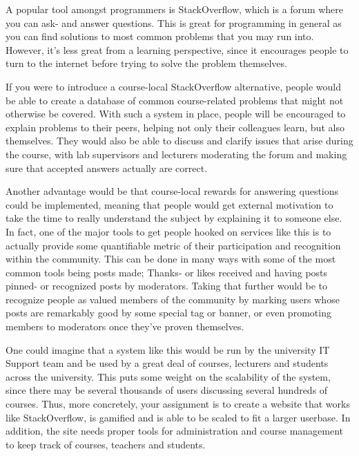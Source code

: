 \begin{refsection}
A popular tool amongst programmers is StackOverflow, which is a forum where you can ask- and answer questions. This is great for programming in general as you can find solutions to most common problems that you may run into. However, it's less great from a learning perspective, since it encourages people to turn to the internet before trying to solve the problem themselves.

If you were to introduce a course-local StackOverflow alternative, people would be able to create a database of common course-related problems that might not otherwise be covered. With such a system in place, people will be encouraged to explain problems to their peers, helping not only their colleagues learn, but also themselves. They would also be able to discuss and clarify issues that arise during the course, with lab supervisors and lecturers moderating the forum and making sure that accepted answers actually are correct.

Another advantage would be that course-local rewards for answering questions could be implemented, meaning that people would get external motivation to take the time to really understand the subject by explaining it to someone else. In fact, one of the major tools to get people hooked on services like this is to actually provide some quantifiable metric of their participation and recognition within the community. This can be done in many ways with some of the most common tools being posts made; Thanks- or likes received and having posts pinned- or recognized posts by moderators. Taking that further would be to recognize people as valued members of the community by marking users whose posts are remarkably good by some special tag or banner, or even promoting members to moderators once they've proven themselves.

One could imagine that a system like this would be run by the university IT Support team and be used by a great deal of courses, lecturers and students across the university. This puts some weight on the scalability of the system, since there may be several thousands of users discussing several hundreds of courses. Thus, more concretely, your assignment is to create a website that works like StackOverflow, is gamified and is able to be scaled to fit a larger userbase. In addition, the site needs proper tools for administration and course management to keep track of courses, teachers and students.


\end{refsection}
